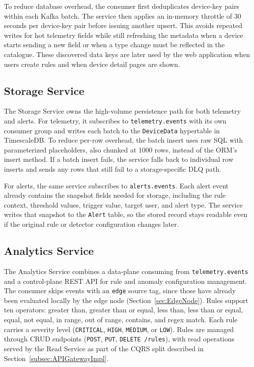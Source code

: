 To reduce database overhead, the consumer first deduplicates device-key pairs within each Kafka batch. The service then applies an in-memory throttle of 30 seconds per device-key pair before issuing another upsert. This avoids repeated writes for hot telemetry fields while still refreshing the metadata when a device starts sending a new field or when a type change must be reflected in the catalogue. These discovered data keys are later used by the web application when users create rules and when device detail pages are shown.

\subsection{Storage Service}
\label{subsec:StorageServiceImpl}

The Storage Service owns the high-volume persistence path for both telemetry and alerts. For telemetry, it subscribes to \texttt{telemetry.events} with its own consumer group and writes each batch to the \texttt{DeviceData} hypertable in TimescaleDB. To reduce per-row overhead, the batch insert uses raw SQL with parameterized placeholders, also chunked at 1000 rows, instead of the \gls{ORM}'s insert method. If a batch insert fails, the service falls back to individual row inserts and sends any rows that still fail to a storage-specific \gls{DLQ} path.

For alerts, the same service subscribes to \texttt{alerts.events}. Each alert event already contains the snapshot fields needed for storage, including the rule context, threshold values, trigger value, target user, and alert type. The service writes that snapshot to the \texttt{Alert} table, so the stored record stays readable even if the original rule or detector configuration changes later.

\subsection{Analytics Service}
\label{subsec:AnalyticsServiceImpl}

The Analytics Service combines a data-plane consuming from \texttt{telemetry.events} and a control-plane \gls{REST} \gls{API} for rule and anomaly configuration management. The consumer skips events with an \texttt{edge} source tag, since those have already been evaluated locally by the edge node (Section~\ref{sec:EdgeNode}). Rules support ten operators: greater than, greater than or equal, less than, less than or equal, equal, not equal, in range, out of range, contains, and regex match. Each rule carries a severity level (\texttt{CRITICAL}, \texttt{HIGH}, \texttt{MEDIUM}, or \texttt{LOW}). Rules are managed through CRUD endpoints (\texttt{POST}, \texttt{PUT}, \texttt{DELETE /rules}), with read operations served by the Read Service as part of the \gls{CQRS} split described in Section~\ref{subsec:APIGatewayImpl}.

